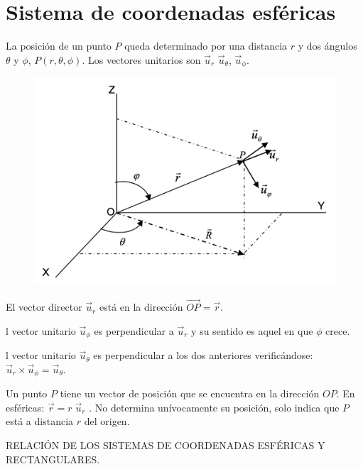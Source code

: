 \section{Sistema de coordenadas esféricas}
La posición de un punto $P$ queda determinado por una distancia $r$ y dos ángulos $\theta$ y $\phi$, $P(r,\theta,\phi)$.  Los vectores unitarios son $\vec u_{r}$ $\vec u_{\theta}$, $\vec u_{\phi}$.

\begin{figure}[H]
	\centering
	\includegraphics[width=.9\textwidth]{imagenes/apendices/APENDICESIM05.png}
\end{figure}

El vector director $\vec u_{r}$ está en la dirección $\overrightarrow{OP}=\vec r$.

l vector unitario $\vec u_{\phi}$ es perpendicular a $\vec u_{r}$ y su sentido es aquel en que $\phi$ crece.

l vector unitario $\vec u_{\theta}$ es perpendicular a los dos anteriores verificándose: $\vec u_{r} \times \vec u_{\phi} = \vec u_{\theta}$.

Un punto $P$ tiene un vector de posición que se encuentra en la dirección $OP$. En esféricas: $\vec r=r\; \vec u_r$ . No determina unívocamente su posición, solo indica que $P$ está a distancia $r$ del origen.


RELACIÓN DE LOS SISTEMAS DE COORDENADAS ESFÉRICAS Y RECTANGULARES.

